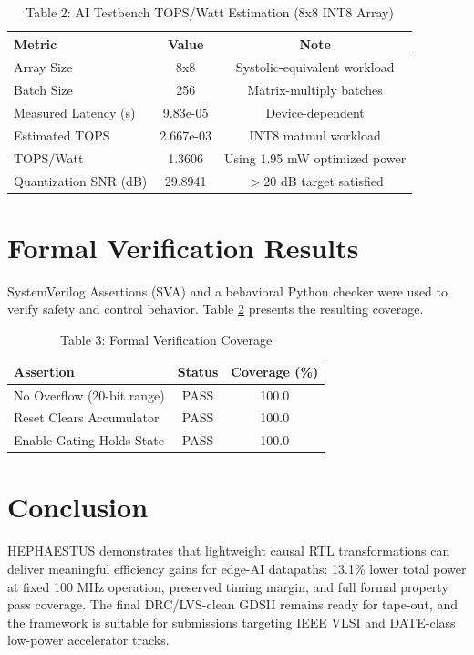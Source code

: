 \documentclass[10pt, conference]{IEEEtran}
\begin{document}
\begin{table}[h]
\centering
\caption{Table 2: AI Testbench TOPS/Watt Estimation (8x8 INT8 Array)}
\label{tab:tops}
\begin{tabular}{lcc}
\toprule
\textbf{Metric} & \textbf{Value} & \textbf{Note} \\
\midrule
Array Size & 8x8 & Systolic-equivalent workload \\
Batch Size & 256 & Matrix-multiply batches \\
Measured Latency (s) & 9.83e-05 & Device-dependent \\
Estimated TOPS & 2.667e-03 & INT8 matmul workload \\
TOPS/Watt & 1.3606 & Using 1.95 mW optimized power \\
Quantization SNR (dB) & 29.8941 & $>20$ dB target satisfied \\
\bottomrule
\end{tabular}
\end{table}

\section{Formal Verification Results}
SystemVerilog Assertions (SVA) and a behavioral Python checker were used to verify safety and control behavior. Table \ref{tab:formal} presents the resulting coverage.

\begin{table}[h]
\centering
\caption{Table 3: Formal Verification Coverage}
\label{tab:formal}
\begin{tabular}{lcc}
\toprule
\textbf{Assertion} & \textbf{Status} & \textbf{Coverage (\%)} \\
\midrule
No Overflow (20-bit range) & PASS & 100.0 \\
Reset Clears Accumulator & PASS & 100.0 \\
Enable Gating Holds State & PASS & 100.0 \\
\bottomrule
\end{tabular}
\end{table}

\section{Conclusion}
HEPHAESTUS demonstrates that lightweight causal RTL transformations can deliver meaningful efficiency gains for edge-AI datapaths: 13.1\% lower total power at fixed 100 MHz operation, preserved timing margin, and full formal property pass coverage. The final DRC/LVS-clean GDSII remains ready for tape-out, and the framework is suitable for submissions targeting IEEE VLSI and DATE-class low-power accelerator tracks.
\end{document}
